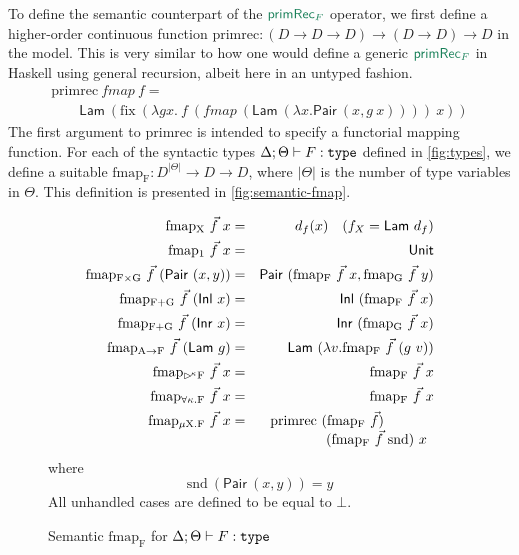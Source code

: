 \documentclass[natbib]{sigplanconf}
\newcommand{\elim}[1]{\textcolor{elim}{\textsf{#1}}}
\newcommand{\sortType}{\texttt{\textup{type}}}
\newcommand{\delayX}[1]{\mathord{\rhd\kern-0.1em^{#1}}}
\newcommand{\semCons}[1]{\mathsf{#1}}
\begin{document}
To define the semantic counterpart of the $\elim{primRec$_F$}$
operator, we first define a higher-order continuous function
$\mathrm{primrec} : (D \to D \to D) \to (D \to D) \to D$ in the
model. This is very similar to how one would define a generic
$\elim{primRec$_F$}$ in Haskell using general recursion, albeit here
in an untyped fashion.
\begin{displaymath}
  \begin{array}{l}
    \mathrm{primrec}\ \mathit{fmap}\ f = \\
    \quad\quad\semCons{Lam}\ (\mathrm{fix}\ (\lambda g x.\ f\ (\mathit{fmap}\ (\semCons{Lam}\ (\lambda x. \semCons{Pair}\ (x, g\ x))))\ x))
  \end{array}
\end{displaymath}
The first argument to $\mathrm{primrec}$ is intended to specify a
functorial mapping function. For each of the syntactic types $\Delta;
\Theta \vdash F : \sortType$ defined in \autoref{fig:types}, we define
a suitable $\mathrm{fmap_F} : D^{|\Theta|} \to D \to D$, where
$|\Theta|$ is the number of type variables in $\Theta$. This
definition is presented in \autoref{fig:semantic-fmap}.

\begin{figure}[t]
  \begin{eqnarray*}
    \mathrm{fmap_X}\ \vec{f}\ x & = & d_f(x)\quad (f_X = \semCons{Lam}\ d_f) \\
    \mathrm{fmap_1}\ \vec{f}\ x & = & \semCons{Unit} \\
    \mathrm{fmap_{F \times G}}\ \vec{f}\ (\semCons{Pair}\ (x,y)) & = & \semCons{Pair}\ (\mathrm{fmap_F}\ \vec{f}\ x, \mathrm{fmap_G}\ \vec{f}\ y) \\
    \mathrm{fmap_{F + G}}\ \vec{f}\ (\semCons{Inl}\ x) & = & \semCons{Inl}\ (\mathrm{fmap_F}\ \vec{f}\ x) \\
    \mathrm{fmap_{F + G}}\ \vec{f}\ (\semCons{Inr}\ x) & = & \semCons{Inr}\ (\mathrm{fmap_G}\ \vec{f}\ x) \\
    \mathrm{fmap_{A \to F}}\ \vec{f}\ (\semCons{Lam}\ g) & = & \semCons{Lam}\ (\lambda v. \mathrm{fmap_F}\ \vec{f}\ (g\ v)) \\
    \mathrm{fmap_{\delayX\kappa F}}\ \vec{f}\ x & = & \mathrm{fmap_F}\ \vec{f}\ x \\
    \mathrm{fmap_{\forall\kappa.F}}\ \vec{f}\ x & = & \mathrm{fmap_F}\ \vec{f}\ x \\
    \mathrm{fmap_{\mu X. F}}\ \vec{f}\ x & = &
    \begin{array}[t]{@{}l}
      \mathrm{primrec}\ (\mathrm{fmap_F}\ \vec{f})\ \\
      \quad\quad\quad\quad(\mathrm{fmap_F}\ \vec{f}\ \mathrm{snd})\ x
    \end{array}
  \end{eqnarray*}
  where
  \begin{displaymath}
    \mathrm{snd}\ (\semCons{Pair}\ (x,y)) = y
  \end{displaymath}
  All unhandled cases are defined to be equal to $\bot$.
  \caption{Semantic $\mathrm{fmap_F}$ for $\Delta; \Theta \vdash F : \sortType$}
  \label{fig:semantic-fmap}
\end{figure}
\end{document}

